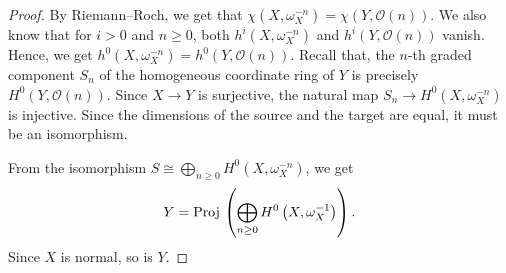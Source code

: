 \documentclass[12pt,reqno]{amsart}
\renewcommand{\to}{{\longrightarrow}}
\numberwithin{equation}{section}
\renewcommand{\O}{\mathcal O}
\newcommand{\Proj}{{\text{\rm Proj}\,}}
\begin{document}
\begin{proof}
  By Riemann--Roch, we get that $\chi(X,\omega_X^{-n}) = \chi(Y, \O(n))$.
  We also know that for $i > 0$ and $n \geq 0$, both $h^i(X, \omega_X^{-n})$ and $h^i(Y, \O(n))$ vanish.
  Hence, we get $h^0(X, \omega_X^{-n}) = h^0(Y, \O(n))$.
  Recall that, the $n$-th graded component $S_n$ of the homogeneous coordinate ring of $Y$ is precisely $H^0(Y, \O(n))$.
  Since $X \to Y$ is surjective, the natural map $S_n \to H^0(X, \omega_X^{-n})$ is injective.
  Since the dimensions of the source and the target are equal, it must be an isomorphism.

  From the isomorphism $S \cong \bigoplus_{n \geq 0} H^0(X, \omega_X^{-n})$, we get
  \[ Y = \Proj\left( \bigoplus_{n \geq 0}H^0\left(X, \omega_X^{-1} \right) \right).\]
  Since $X$ is normal, so is $Y$.
\end{proof}
\end{document}
